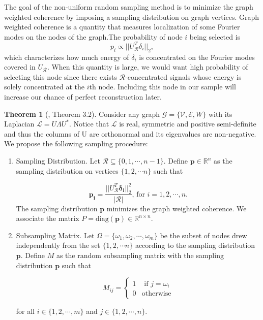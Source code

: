 \documentclass[a4paper]{article}
\newcommand{\R}{\mathcal{R}}
\newcommand{\RR}{\mathbb{R}}
\newcommand{\G}{\mathcal{G}}
\newcommand{\V}{\mathcal{V}}
\newcommand{\E}{\mathcal{E}}
\newcommand{\La}{\mathcal{L}}
\theoremstyle{definition}
\newtheorem*{thm}{Theorem}
\begin{document}
The goal of the non-uniform random sampling method is to minimize the graph weighted coherence by imposing a sampling distribution on graph vertices. Graph weighted coherence is a quantity that measures localization of some Fourier modes on the nodes of the graph.The probability of node $i$ being selected is $$p_i\propto ||U_{\R}^T\delta_i||_2,$$ which characterizes how much energy of $\delta_i$ is concentrated on the Fourier modes covered in $U_{\R}$. When this quantity is large, we would want high probability of selecting this node since there exists $\R$-concentrated signals whose energy is solely concentrated at the $i$th node. Including this node in our sample will increase our chance of perfect reconstruction later.

\begin{thm}[\cite{puy}, Theorem 3.2]
Consider any graph $\G = \{\V, \E, W\}$ with its Laplacian $\La = U\Lambda U^*$. Notice that $\La$ is real, symmetric and positive semi-definite and thus the columns of U are orthonormal and its eigenvalues are non-negative. We propose the following sampling procedure:

\begin{enumerate}

\item Sampling Distribution. Let $\R \subseteq \{0,1,\cdots, n-1\}$. Define $\bm{p} \in \RR^n$ as the sampling distribution on vertices $\{1,2, \cdots n\}$  such that 

\[\bm{p_i} = \frac{||U^T_\R\bm{\delta_i}||^2_2}{|\R|} \text{, for } i = 1,2 ,\cdots, n. \tag{1}\]  
The sampling distribution $\bm{p}$ minimizes the graph weighted coherence. We associate the matrix $P = \text{diag}(\bm{p}) \in \RR^{n\times n}$.

\item Subsampling Matrix. Let $\Omega = \{\omega_1, \omega_2, \cdots, \omega_m\}$ be the subset of nodes drew independently from the set $\{1,2,\cdots n\}$ according to the sampling distribution $\bm{p}$. Define $M$ as the random subsampling matrix with the sampling distribution $\bm{p}$ such that

\[M_{ij} = 
\begin{cases} 
      1 & \text{ if } j = \omega_{i}\\
      0 & \text{otherwise}
   \end{cases}
\tag{2}\] 

for all $i \in \{1,2,\cdots,m\}$ and $j \in \{1,2,\cdots, n\}$.

\end{enumerate}


\end{thm}
\end{document}

